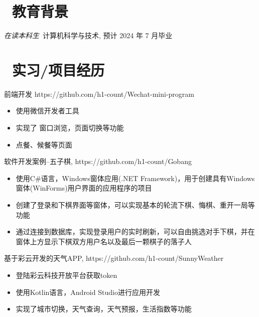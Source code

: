 \documentclass{resume}
\begin{document}


 
\section{\faGraduationCap\  教育背景}
\textit{在读本科生}\ 计算机科学与技术, 预计 2024 年 7 月毕业

\section{\faUsers\ 实习/项目经历}
前端开发 https://github.com/h1-count/Wechat-mini-program
\begin{itemize}
  \item 使用微信开发者工具
  \item 实现了 窗口浏览，页面切换等功能
  \item 点餐、候餐等页面
\end{itemize}

\begin{onehalfspacing}
软件开发案例--五子棋, https://github.com/h1-count/Gobang
\begin{itemize}
  \item 使用C\#语言，Windows窗体应用(.NET Framework)，用于创建具有Windows窗体(WinForms)用户界面的应用程序的项目
  \item 创建了登录和下棋界面等窗体，可以实现基本的轮流下棋、悔棋、重开一局等功能
  \item 通过连接到数据库，实现登录用户的实时刷新，可以自由挑选对手下棋，并在窗体上方显示下棋双方用户名以及最后一颗棋子的落子人
\end{itemize}
\end{onehalfspacing}

\begin{onehalfspacing}
基于彩云开发的天气APP, https://github.com/h1-count/SunnyWeather
\begin{itemize}
  \item 登陆彩云科技开放平台获取token
  \item 使用Kotlin语言，Android Studio进行应用开发
  \item 实现了城市切换，天气查询，天气预报，生活指数等功能
\end{itemize}
\end{onehalfspacing}
\end{document}
